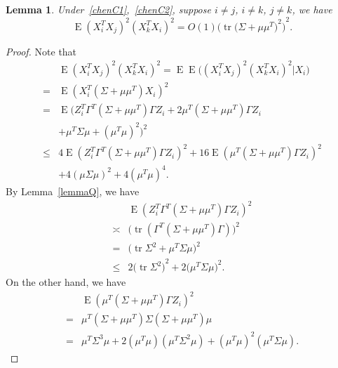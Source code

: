 \documentclass[review]{elsarticle}
\DeclareMathOperator{\mytr}{tr}
\DeclareMathOperator{\myE}{E}
\theoremstyle{plain}
\newtheorem{lemma}{Lemma}
\theoremstyle{definition}
\theoremstyle{remark}
\begin{document}
\begin{lemma}\label{smallLemma2}
    Under~\eqref{chenC1},~\eqref{chenC2}, suppose $i\neq j$, $i\neq k$, $j\neq k$, we have
    \begin{equation}\label{eq:2}
            \myE{(X_i^T X_j)}^2{(X_k^T X_i)}^2=
             O(1){\Big(\mytr {\big(\Sigma+\mu\mu^T\big)}^2\Big)}^2.
    \end{equation}
\end{lemma}
\begin{proof}
Note that
    \begin{equation*}
        \begin{aligned}
            &\myE{(X_i^T X_j)}^2{(X_k^T X_i)}^2
            = 
            \myE\myE\big({(X_i^T X_j)}^2{(X_k^T X_i)}^2| X_i\big)\\
            =&
            \myE{(X_i^T (\Sigma+\mu\mu^T) X_i )}^2\\
            =&
            \myE\Big(Z_i^T \Gamma^T (\Sigma+\mu\mu^T) \Gamma Z_i+ 2\mu^T (\Sigma+\mu\mu^T)\Gamma Z_i \\
            &+\mu^T \Sigma \mu +(\mu^T\mu)^2 \Big)^2\\
            \leq&
            4\myE(Z_i^T \Gamma^T (\Sigma+\mu\mu^T) \Gamma Z_i)^2+ 16\myE(\mu^T (\Sigma+\mu\mu^T)\Gamma Z_i)^2 \\
            &+4(\mu \Sigma \mu)^2 +4(\mu^T\mu)^4.
        \end{aligned}
    \end{equation*}
    By Lemma~\eqref{lemmaQ}, we have
    \begin{equation*}
        \begin{aligned}
            &\myE(Z_i^T \Gamma^T (\Sigma+\mu\mu^T) \Gamma Z_i)^2\\
            \asymp&
\big(\mytr (\Gamma^T (\Sigma+\mu\mu^T)\Gamma)\big)^2\\
            =&
\big(\mytr \Sigma^2+\mu^T\Sigma \mu\big)^2\\
            \leq&
            2{\big(\mytr \Sigma^2\big)}^2+2{\big(\mu^T\Sigma \mu\big)}^2.
        \end{aligned}
    \end{equation*}
    On the other hand, we have
    \begin{equation*}
        \begin{aligned}
            &\myE(\mu^T (\Sigma+\mu\mu^T)\Gamma Z_i)^2\\
            =&
\mu^T (\Sigma+\mu\mu^T)\Sigma (\Sigma+\mu\mu^T)\mu\\
            =&\mu^T \Sigma^3 \mu+2(\mu^T\mu)(\mu^T\Sigma^2\mu)+{(\mu^T\mu)}^2(\mu^T\Sigma\mu).

\end{aligned}
\end{equation*}
\end{proof}
\end{document}
